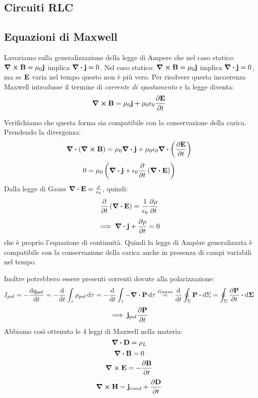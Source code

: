 \documentclass[12pt,a4paper]{article}
\begin{document}
\subsection{Circuiti RLC}
\subsection{Equazioni di Maxwell}
Lavoriamo sulla generalizzazione della legge di Ampere che nel caso statico: $\curl{\vb{B}}= \mu_0\vb{j}$ implica $\div{\vb{j}}=0$.
Nel caso statico: $\curl{\vb{B}}= \mu_0\vb{j}$ implica $\div{\vb{j}}=0$, ma se $\vb{E}$ varia nel tempo questo non è più vero. Per risolvere questa incoerenza Maxwell introdusse il termine di \textit{corrente di spostamento} e la legge diventa:
\begin{equation*}
    \curl{\vb{B}} = \mu_0 \vb{j} + \mu_0 \epsilon_0 \pdv{\vb{E}}{t}
\end{equation*}

Verifichiamo che questa forma sia compatibile con la conservazione della carica. Prendendo la divergenza:
\begin{equation*}
    \div(\curl{\vb{B}}) = \mu_0 \div{\vb{j}} + \mu_0 \epsilon_0 \div\left( \pdv{\vb{E}}{t} \right)
\end{equation*}
\begin{equation*}
    0 = \mu_0 \left( \div{\vb{j}} + \epsilon_0 \pdv{ }{t} \left(\div{\vb{E}}\right) \right)
\end{equation*}
Dalla legge di Gauss $\div{\vb{E}} = \frac{\rho}{\epsilon_0}$, quindi:
\begin{equation*}
    \pdv{ }{t} \left(\div{\vb{E}}\right) = \frac{1}{\epsilon_0}\pdv{\rho}{t}
\end{equation*}
\begin{equation*}
    \implies \div{\vb{j}} + \pdv{\rho}{t} = 0
\end{equation*}
che è proprio l'equazione di continuità. Quindi la legge di Ampère generalizzata è compatibile con la conservazione della carica anche in presenza di campi variabili nel tempo.


Inoltre potrebbero essere presenti correnti dovute alla polarizzazione:
\begin{equation*}
    I_{pol}= - \dv{q_{pol}}{t} = - \dv{ }{t} \int_\tau \rho_{pol} \dd{\tau}= - \dv{ }{t} \int_\tau-\div{\vb{P}}\dd{\tau}
    \overset{Gauss}{=} \dv{ }{t}\oint_\Sigma \vb{P}\vdot \dd{\Sigma}= \oint_\Sigma \pdv{\vb{P}}{t}\vdot\dd{\vb{\Sigma}}
\end{equation*}
\begin{equation*}
    \implies \vb{j}_{pol} \pdv{\vb{P}}{t} 
\end{equation*}
Abbiamo così ottenuto le 4 leggi di Maxwell nella materia:
\begin{equation*}
    \div{\vb{D}}= \rho_L 
\end{equation*}
\begin{equation*}
    \div{\vb{B}}= 0
\end{equation*}
\begin{equation*}
    \curl{\vb{E}}= -\pdv{\vb{B}}{t}
\end{equation*}
\begin{equation*}
    \curl{\vb{H}}= \vb{j}_{cond}+ \pdv{\vb{D}}{t}
\end{equation*}
\end{document}
